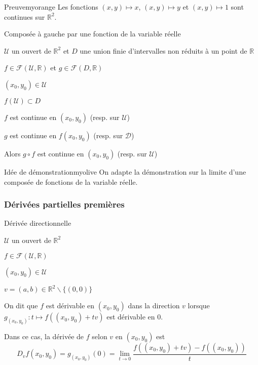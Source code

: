     \begin{demo}{Preuve}{myorange}
        Les fonctions $(x,y) \mapsto x$, $(x,y) \mapsto y$ et $(x,y) \mapsto 1$ sont continues sur $\mathbb{R}^2$.
    \end{demo}

    \begin{prop}{Composée à gauche par une fonction de la variable réelle}{}
        \begin{soient}
            \item $\mathcal{U}$ un ouvert de $\mathbb{R}^2$ et $D$ une union finie d’intervalles non réduits à un point de $\mathbb{R}$
            \item $f \in \mathcal{F}(\mathcal{U},\mathbb{R})$ et $g \in \mathcal{F}(D,\mathbb{R})$
            \item $(x_0,y_0) \in \mathcal{U}$
        \end{soient}
        \begin{suppose}
            \item $f(\mathcal{U}) \subset D$
            \item $f$ est continue en $(x_0,y_0)$ (resp. sur $\mathcal{U}$)
            \item $g$ est continue en $f(x_0,y_0)$ (resp. sur $\mathcal{D}$)
        \end{suppose}
        Alors $g \circ f$ est continue en $(x_0,y_0)$ (resp. sur $\mathcal{U}$)
    \end{prop}

    \begin{demo}{Idée de démonstration}{myolive}
        On adapte la démonstration sur la limite d’une composée de fonctions de la variable réelle.
    \end{demo}

    \subsubsection{Dérivées partielles premières}

    \begin{defi}{Dérivée directionnelle}{}
        \begin{soient}
            \item $\mathcal{U}$ un ouvert de $\mathbb{R}^2$
            \item $f \in \mathcal{F}(\mathcal{U},\mathbb{R})$
            \item $(x_0,y_0) \in \mathcal{U}$
            \item $v = (a,b) \in \mathbb{R}^2 \backslash \{ (0,0) \}$
        \end{soient}
        On dit que $f$ est dérivable en $(x_0,y_0)$ dans la direction $v$ lorsque $g_{(x_0,y_0)} : t \mapsto f((x_0,y_0)+tv)$ est dérivable en 0. 
        
        Dans ce cas, la dérivée de $f$ selon $v$ en $(x_0,y_0)$ est 
        \[D_v f(x_0,y_0) = g_{(x_0,y_0)}(0) = \lim\limits_{t \rightarrow 0} \frac{f((x_0,y_0)+tv) - f((x_0,y_0))}{t} \]
    \end{defi}

